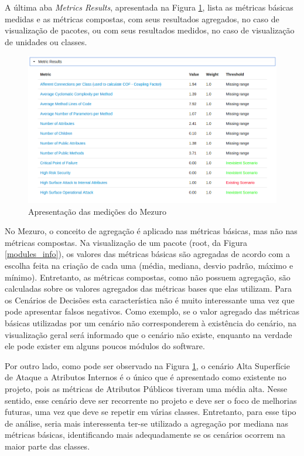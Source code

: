 A última aba \emph{Metrics Results}, apresentada na Figura \ref{metrics_info}, lista as métricas básicas medidas e as métricas compostas, com seus resultados agregados, no caso de visualização de pacotes, ou com seus resultados medidos, no caso de visualização de unidades ou classes. 

\begin{figure}
	\centering
		\includegraphics[scale=0.5]{figuras/metrics_info}
		\caption{Apresentação das medições do Mezuro}
		\label{metrics_info}
\end{figure}

No Mezuro, o conceito de agregação é aplicado nas métricas básicas, mas não nas métricas compostas. Na visualização de um pacote (root, da Figura \ref{modules_info}), os valores das métricas básicas são agregadas de acordo com a escolha feita na criação de cada uma (média, mediana, desvio padrão, máximo e mínimo). Entretanto, as métricas compostas, como não possuem agregação, são calculadas sobre os valores agregados das métricas bases que elas utilizam. Para os Cenários de Decisões esta característica não é muito interessante uma vez que pode apresentar falsos negativos. Como exemplo, se o valor agregado das métricas básicas utilizadas por um cenário não corresponderem à existência do cenário, na visualização geral será informado que o cenário não existe, enquanto na verdade ele pode exister em alguns poucos módulos do software. 

Por outro lado, como pode ser observado na Figura \ref{metrics_info}, o cenário Alta Superfície de Ataque a Atributos Internos é o único que é apresentado como existente no projeto, pois as métricas de Atributos Públicos tiveram uma média alta. Nesse sentido, esse cenário deve ser recorrente no projeto e deve ser o foco de melhorias futuras, uma vez que deve se repetir em várias classes. Entretanto, para esse tipo de análise, seria mais interessenta ter-se utilizado a agregação por mediana nas métricas básicas, identificando mais adequadamente se os cenários ocorrem na maior parte das classes.

